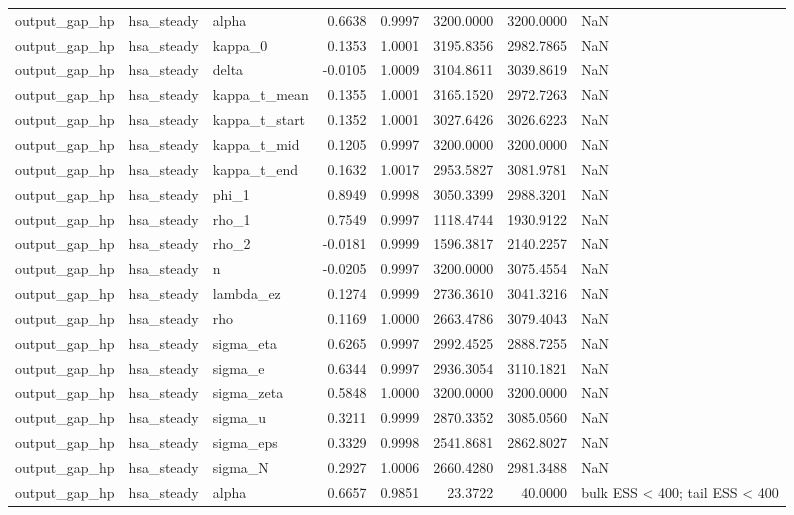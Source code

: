 \begin{tabular}{lllrrrrl}
output\_gap\_hp & hsa\_steady & alpha & 0.6638 & 0.9997 & 3200.0000 & 3200.0000 & NaN \\
output\_gap\_hp & hsa\_steady & kappa\_0 & 0.1353 & 1.0001 & 3195.8356 & 2982.7865 & NaN \\
output\_gap\_hp & hsa\_steady & delta & -0.0105 & 1.0009 & 3104.8611 & 3039.8619 & NaN \\
output\_gap\_hp & hsa\_steady & kappa\_t\_mean & 0.1355 & 1.0001 & 3165.1520 & 2972.7263 & NaN \\
output\_gap\_hp & hsa\_steady & kappa\_t\_start & 0.1352 & 1.0001 & 3027.6426 & 3026.6223 & NaN \\
output\_gap\_hp & hsa\_steady & kappa\_t\_mid & 0.1205 & 0.9997 & 3200.0000 & 3200.0000 & NaN \\
output\_gap\_hp & hsa\_steady & kappa\_t\_end & 0.1632 & 1.0017 & 2953.5827 & 3081.9781 & NaN \\
output\_gap\_hp & hsa\_steady & phi\_1 & 0.8949 & 0.9998 & 3050.3399 & 2988.3201 & NaN \\
output\_gap\_hp & hsa\_steady & rho\_1 & 0.7549 & 0.9997 & 1118.4744 & 1930.9122 & NaN \\
output\_gap\_hp & hsa\_steady & rho\_2 & -0.0181 & 0.9999 & 1596.3817 & 2140.2257 & NaN \\
output\_gap\_hp & hsa\_steady & n & -0.0205 & 0.9997 & 3200.0000 & 3075.4554 & NaN \\
output\_gap\_hp & hsa\_steady & lambda\_ez & 0.1274 & 0.9999 & 2736.3610 & 3041.3216 & NaN \\
output\_gap\_hp & hsa\_steady & rho & 0.1169 & 1.0000 & 2663.4786 & 3079.4043 & NaN \\
output\_gap\_hp & hsa\_steady & sigma\_eta & 0.6265 & 0.9997 & 2992.4525 & 2888.7255 & NaN \\
output\_gap\_hp & hsa\_steady & sigma\_e & 0.6344 & 0.9997 & 2936.3054 & 3110.1821 & NaN \\
output\_gap\_hp & hsa\_steady & sigma\_zeta & 0.5848 & 1.0000 & 3200.0000 & 3200.0000 & NaN \\
output\_gap\_hp & hsa\_steady & sigma\_u & 0.3211 & 0.9999 & 2870.3352 & 3085.0560 & NaN \\
output\_gap\_hp & hsa\_steady & sigma\_eps & 0.3329 & 0.9998 & 2541.8681 & 2862.8027 & NaN \\
output\_gap\_hp & hsa\_steady & sigma\_N & 0.2927 & 1.0006 & 2660.4280 & 2981.3488 & NaN \\
output\_gap\_hp & hsa\_steady & alpha & 0.6657 & 0.9851 & 23.3722 & 40.0000 & bulk ESS < 400; tail ESS < 400 \\

\end{tabular}
